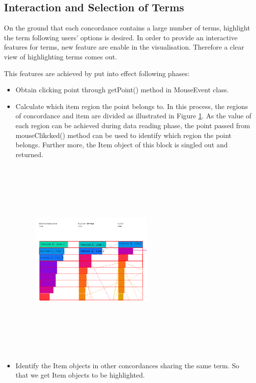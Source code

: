 \subsection{Interaction and Selection of Terms}

On the ground that each concordance contains a large number of terms, highlight the term following users' options is desired. In order to provide an interactive features for terms, new feature are enable in the visualisation. Therefore a clear view of highlighting terms comes out. 

This features are achieved by put into effect following phases:
\begin{itemize}
	\item \textbf{} Obtain clicking point through getPoint() method in MouseEvent class.
	\item \textbf{} Calculate which item region the point belongs to. In this process, the regions of concordance and item are divided as illustrated in Figure \ref{fig:regionDivide}. As the value of each region can be achieved during data reading phase, the point passed from mouseClikcked() method can be used to identify which region the point belongs. Further more, the Item object of this block is singled out and returned.
	\begin{figure}[h]
		\centering	
		\includegraphics[width=6cm, height=10cm]{Figs/Region-Divide}\\[1ex]
		\caption{}
		\label{fig:regionDivide}
	\end{figure} 
	\item \textbf{} Identify the Item objects in other concordances sharing the same term. So that we get Item objects to be highlighted.

\end{itemize}
